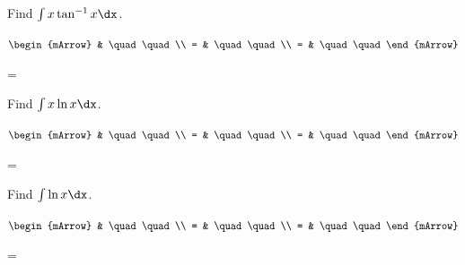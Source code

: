 \clearpage\noindent%
\begin{mtask}[resume]
   \task \begin{exercise} Find $\int x \tan^{-1}x \dx$.
           \begin{envSolution}
             $\begin{mArrow}
                   & \quad \quad              \\
		   		 = & \quad \quad              \\
				 = & \quad \quad 
              \end{mArrow}$
            \begin{shortsolution}  
			     =$ \quad \quad \quad \quad$
			\end{shortsolution}				 
           \end{envSolution}
         \end{exercise}
\end{mtask}

\clearpage\noindent%
\begin{mtask}[resume]
   \task \begin{exercise} Find $\int x \ln x \dx$.
           \begin{envSolution}
             $\begin{mArrow}
                   & \quad \quad              \\
		   		 = & \quad \quad              \\
				 = & \quad \quad 
              \end{mArrow}$
            \begin{shortsolution}  
			     =$ \quad \quad \quad \quad$
			\end{shortsolution}				 
           \end{envSolution}
         \end{exercise}

   \task \begin{exercise} Find $\int \ln x \dx$.
           \begin{envSolution}
             $\begin{mArrow}
                   & \quad \quad              \\
		   		 = & \quad \quad              \\
				 = & \quad \quad 
              \end{mArrow}$
            \begin{shortsolution}  
			     =$ \quad \quad \quad \quad$
			\end{shortsolution}				 
           \end{envSolution}
         \end{exercise}


\end{mtask}


